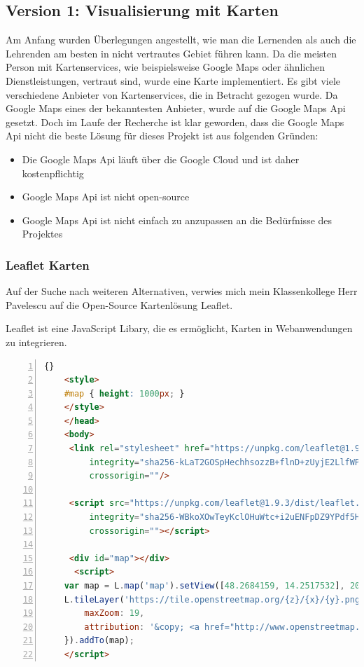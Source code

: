 \subsection{Version 1: Visualisierung mit Karten}
Am Anfang wurden Überlegungen angestellt, wie man die Lernenden als auch die Lehrenden am besten in nicht vertrautes Gebiet führen kann.
Da die meisten Person mit Kartenservices, wie beispielsweise Google Maps oder ähnlichen Dienstleistungen, vertraut sind, wurde eine Karte implementiert.
Es gibt viele verschiedene Anbieter von Kartenservices, die in Betracht gezogen wurde. 
Da Google Maps eines der bekanntesten Anbieter, wurde auf die Google Maps Api gesetzt. 
Doch im Laufe der Recherche ist klar geworden, dass die Google Maps Api nicht die beste Lösung für dieses Projekt ist  aus folgenden Gründen: 
\begin{itemize}
    \item Die Google Maps Api läuft über die Google Cloud und ist daher kostenpflichtig
    \item Google Maps Api ist nicht open-source
    \item Google Maps Api ist nicht einfach zu anzupassen an die Bedürfnisse des Projektes 
\end{itemize}\cite{Ashraf}

\subsubsection{Leaflet Karten}
Auf der Suche nach weiteren Alternativen, verwies mich mein Klassenkollege Herr Pavelescu auf die Open-Source Kartenlösung Leaflet.

Leaflet ist eine JavaScript Libary, die es ermöglicht, Karten in Webanwendungen zu integrieren. \cite{Agafonkin} 

\newpage


\begin{lstlisting}[numbers=left,language=HTML,caption={Implementierung einer Karte mit Leaflet},label={lst:leafletmap}]{}
    <style>
    #map { height: 1000px; }
    </style>
    </head>
    <body>
     <link rel="stylesheet" href="https://unpkg.com/leaflet@1.9.3/dist/leaflet.css"
         integrity="sha256-kLaT2GOSpHechhsozzB+flnD+zUyjE2LlfWPgU04xyI="
         crossorigin=""/>
    
     <script src="https://unpkg.com/leaflet@1.9.3/dist/leaflet.js"
         integrity="sha256-WBkoXOwTeyKclOHuWtc+i2uENFpDZ9YPdf5Hf+D7ewM="
         crossorigin=""></script>
    
     <div id="map"></div>
      <script>
    var map = L.map('map').setView([48.2684159, 14.2517532], 20);
    L.tileLayer('https://tile.openstreetmap.org/{z}/{x}/{y}.png', {
        maxZoom: 19,
        attribution: '&copy; <a href="http://www.openstreetmap.org/copyright">OpenStreetMap</a>'
    }).addTo(map);
    </script> 
\end{lstlisting}

